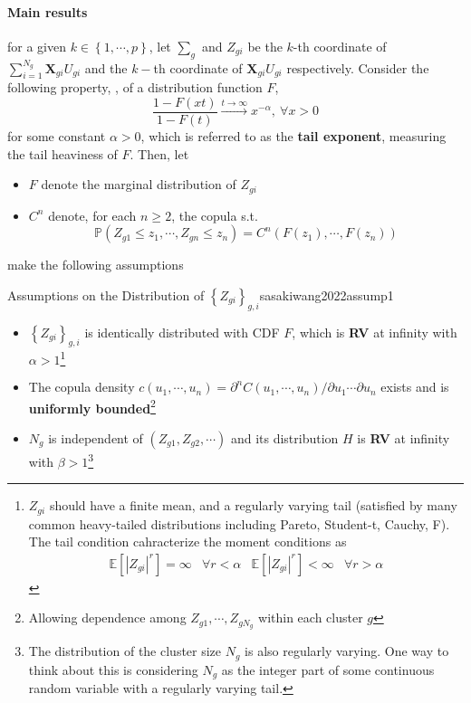 \documentclass[twoside]{article}
\begin{document}
\paragraph*{Main results} for a given $k\in \left\{1,\cdots, p\right\}$, let $\sum_g$ and $Z_{gi}$ be the $k$-th coordinate of $\sum^{N_g}_{i=1} \mathbf{X}_{gi}U_{gi}$ and the $k-$th coordinate of $ \mathbf{X}_{gi}U_{gi}$ respectively.
Consider the following property, , of a distribution function $F$,
$$
\frac{1-F(xt)}{1-F(t)} \xrightarrow{t\rightarrow \infty} x^{-\alpha},\ \forall x>0
$$
for some constant $\alpha >0$, which is referred to as the \textbf{tail exponent}, measuring the tail heaviness of $F$. Then, let 
\begin{itemize}
    \item $F$ denote the marginal distribution of $Z_{gi}$
    \item $C^n$ denote, for each $n\geq 2$, the copula s.t. $$ \mathbb{P}\left(Z_{g1}\leq z_1, \cdots, Z_{gn}\leq z_n\right) = C^n \left(F(z_1),\cdots, F(z_n)\right) $$
\end{itemize}
\citet{sasaki2022non} make the following assumptions 
\begin{assumption}{Assumptions on the Distribution of $\left\{Z_{gi}\right\}_{g,i}$}{sasakiwang2022assump1}
    \begin{itemize}
        \item $\left\{Z_{gi}\right\}_{g,i}$ is identically distributed with CDF $F$, which is \textbf{RV} at infinity with $\alpha >1$\footnote{$Z_{gi}$ should have a finite mean, and a regularly varying tail (satisfied by many common heavy-tailed distributions including Pareto, Student-t, Cauchy, F). The tail condition cahracterize the moment conditions as \begin{align*}\mathbb{E}\left[\left\vert Z_{gi}\right\vert^r\right]=\infty &\forall r< \alpha & \mathbb{E}\left[\left\vert Z_{gi}\right\vert^r\right]<\infty &\forall r> \alpha \end{align*} }
        \item The copula density $c(u_1,\cdots,u_n) = \partial^n C(u_1,\cdots, u_n)/\partial u_1\cdots \partial u_n$ exists and is \textbf{uniformly bounded}\footnote{Allowing dependence among $Z_{g1},\cdots, Z_{gN_g}$ within each cluster $g$}
        \item $N_g$ is independent of $\left(Z_{g1},Z_{g2},\cdots\right)$ and its distribution $H$ is \textbf{RV} at infinity with $\beta>1$\footnote{The distribution of the cluster size $N_g$ is also regularly varying. One way to think about this is considering $N_g$ as the integer part of some continuous random variable with a regularly varying tail.}
    \end{itemize}
\end{assumption}
\end{document}
